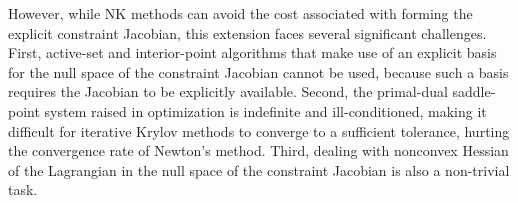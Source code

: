 \documentclass{article}
\theoremstyle{definition}
\begin{document}
However, while NK methods can avoid the cost associated with forming the explicit constraint Jacobian, this extension faces several significant challenges. First, active-set and interior-point algorithms that make use of an explicit basis for the null space of the constraint Jacobian cannot be used, because such a basis requires the Jacobian to be explicitly available.  Second, the primal-dual saddle-point system raised in optimization is indefinite and ill-conditioned, making it difficult for iterative Krylov methods to converge to a sufficient tolerance, hurting the convergence rate of Newton's method. Third, dealing with nonconvex Hessian of the Lagrangian in the null space of the constraint Jacobian is also a non-trivial task. 



\end{document}
